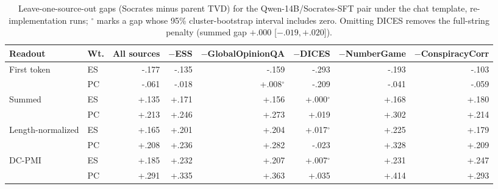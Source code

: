 \begin{table}[t]
\centering\scriptsize
\setlength{\tabcolsep}{4pt}
\begin{tabular}{@{}llrrrrrr@{}}
\toprule
Readout & Wt. & All sources & $-$ESS & $-$GlobalOpinionQA & $-$DICES & $-$NumberGame & $-$ConspiracyCorr \\
\midrule
First token & ES & -.177 & -.135 & -.159 & -.293 & -.193 & -.103 \\
 & PC & -.061 & -.018 & +.008$^{\circ}$ & -.209 & -.041 & -.059 \\
Summed & ES & +.135 & +.171 & +.156 & +.000$^{\circ}$ & +.168 & +.180 \\
 & PC & +.213 & +.246 & +.273 & +.019 & +.302 & +.214 \\
Length-normalized & ES & +.165 & +.201 & +.204 & +.017$^{\circ}$ & +.225 & +.179 \\
 & PC & +.208 & +.236 & +.282 & -.023 & +.328 & +.209 \\
DC-PMI & ES & +.185 & +.232 & +.207 & +.007$^{\circ}$ & +.231 & +.247 \\
 & PC & +.291 & +.335 & +.363 & +.035 & +.414 & +.293 \\
\bottomrule
\end{tabular}
\caption{Leave-one-source-out gaps (Socrates minus parent TVD) for the Qwen-14B/Socrates-SFT pair under the chat template, re-implementation runs; $^{\circ}$ marks a gap whose 95\% cluster-bootstrap interval includes zero. Omitting DICES removes the full-string penalty (summed \ES{} gap $+.000$ [$-.019,+.020$]).}
\label{tab:loo-socrates-reimpl}
\end{table}
